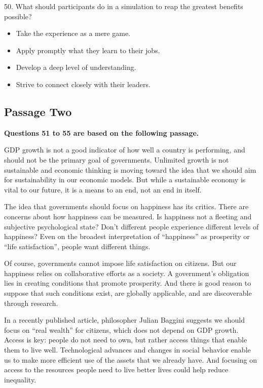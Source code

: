 \documentclass[UTF8,11pt]{ctexart}
\begin{document}
50. What should participants do in a simulation to reap the greatest benefits possible?


\begin{itemize}[leftmargin=2em,itemsep=.2em,topsep=.4em]\item[A.] Take the experience as a mere game.
\item[B.] Apply promptly what they learn to their jobs.
\item[C.] Develop a deep level of understanding.
\item[D.] Strive to connect closely with their leaders.
\end{itemize}

\subsection*{\textbf{Passage Two}}


\textbf{Questions 51 to 55 are based on the following passage.}


GDP growth is not a good indicator of how well a country is performing, and should not be the primary goal of governments. Unlimited growth is not sustainable and economic thinking is moving toward the idea that we should aim for sustainability in our economic models. But while a sustainable economy is vital to our future, it is a means to an end, not an end in itself.


The idea that governments should focus on happiness has its critics. There are concerns about how happiness can be measured. Is happiness not a fleeting and subjective psychological state? Don’t different people experience different levels of happiness? Even on the broadest interpretation of “happiness” as prosperity or “life satisfaction”, people want different things.


Of course, governments cannot impose life satisfaction on citizens. But our happiness relies on collaborative efforts as a society. A government’s obligation lies in creating conditions that promote prosperity. And there is good reason to suppose that such conditions exist, are globally applicable, and are discoverable through research.


In a recently published article, philosopher Julian Baggini suggests we should focus on “real wealth” for citizens, which does not depend on GDP growth. Access is key: people do not need to own, but rather access things that enable them to live well. Technological advances and changes in social behavior enable us to make more efficient use of the assets that we already have. And focusing on access to the resources people need to live better lives could help reduce inequality.
\end{document}
